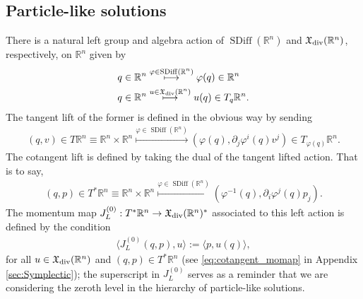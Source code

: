 \documentclass[12pt]{amsart}
\newcommand{\R}{\ensuremath{\mathbb{R}}}
\DeclareMathOperator{\SDiff}{SDiff}
\begin{document}
\subsection{Particle-like solutions}
\label{sec:Momentum maps}
There is a natural left group and algebra action of $\SDiff(\R^n)$
and $\mathfrak{X}_{\rm div}(\R^n)$, respectively, on $\R^n$ given by
\begin{align*}
  q \in \R^n
  &\stackrel{ \varphi \in \SDiff(\R^n) }{\longmapsto}
  \varphi(q) \in \R^n \\
  q \in \R^n
  &\stackrel{ u \in \mathfrak{X}_{\rm div}(\R^n) }{\longmapsto}
  u(q) \in T_q\R^n.
\end{align*}
The tangent lift of the former is defined in the obvious way by sending
\begin{align*}
  (q,v) \in T\R^n \equiv \R^n \times \R^n
  \stackrel{ \varphi \in \SDiff(\R^n) }{\longmapsto}
  (\varphi(q) , \partial_j\varphi^i(q) v^j ) \in T_{\varphi(q)} \R^n.
\end{align*}
The cotangent lift is defined by taking the dual
of  the tangent lifted action.
That is to say,
\begin{align*}
  (q, p) \in T^*\R^n \equiv \R^n \times \R^n
  \stackrel{ \varphi \in \SDiff(\R^n) }{\longmapsto}
  (\varphi^{-1}(q) , \partial_i\varphi^j(q) p_j ).
\end{align*}
The momentum map 
$J^{(0)}_L : T^*\R^n \to \mathfrak{X}_{\rm div}(\R^n)^*$
associated to this left action is defined by the
condition
\begin{align*}
  \langle J_L^{(0)}( q , p) , u \rangle := \langle p , u(q) \rangle,
\end{align*}
for all $u \in \mathfrak{X}_{\rm div}(\R^n)$ and $(q,p) \in T^*\R^n$ (see \eqref{eq:cotangent_momap} in Appendix \ref{sec:Symplectic}); the superscript in $J_L^{(0)}$ serves as a reminder that we are considering the zeroth level in the hierarchy of particle-like solutions.
\end{document}
